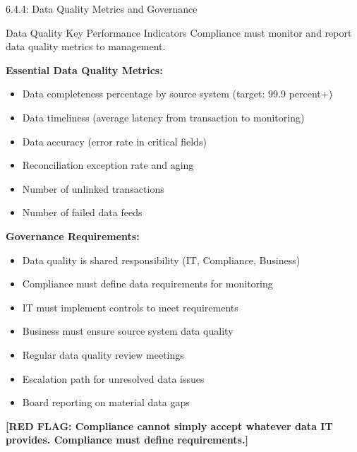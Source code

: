 \documentclass[11pt,a4paper]{beamer}
\newcommand{\redflag}[1]{\textcolor{red!80!black}{\textbf{[RED FLAG: #1]}}}
\begin{document}
\begin{frame}{6.4.4: Data Quality Metrics and Governance}
	\begin{block}{Data Quality Key Performance Indicators}
		Compliance must monitor and report data quality metrics to management.
	\end{block}
	\textbf{Essential Data Quality Metrics:}
	\begin{itemize}
		\item Data completeness percentage by source system (target: 99.9 percent+)
		\item Data timeliness (average latency from transaction to monitoring)
		\item Data accuracy (error rate in critical fields)
		\item Reconciliation exception rate and aging
		\item Number of unlinked transactions
		\item Number of failed data feeds
	\end{itemize}
	\textbf{Governance Requirements:}
	\begin{itemize}
		\item Data quality is shared responsibility (IT, Compliance, Business)
		\item Compliance must define data requirements for monitoring
		\item IT must implement controls to meet requirements
		\item Business must ensure source system data quality
		\item Regular data quality review meetings
		\item Escalation path for unresolved data issues
		\item Board reporting on material data gaps
	\end{itemize}
	\redflag{Compliance cannot simply accept whatever data IT provides. Compliance must define requirements.}
\end{frame}

\end{document}
